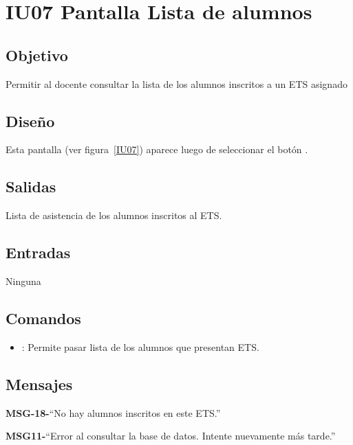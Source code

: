 \section{IU07 Pantalla Lista de alumnos}

\subsection{Objetivo}
Permitir al docente consultar la lista de los alumnos inscritos a un ETS asignado

\subsection{Diseño}
Esta pantalla  (ver figura~\ref{IU07}) aparece luego de seleccionar el botón .


\subsection{Salidas}
Lista de asistencia de los alumnos inscritos al ETS.

\subsection{Entradas}
Ninguna

\subsection{Comandos}
\begin{itemize}
	\item {}: Permite pasar lista de los alumnos que presentan ETS.
\end{itemize}

\subsection{Mensajes}

\begin{Citemize}
	\item {\bf MSG-18-}{``No hay alumnos inscritos en este ETS.''}
	\item  {\bf MSG11-}{``Error al consultar la base de datos. Intente nuevamente más tarde.''} 
\end{Citemize}

